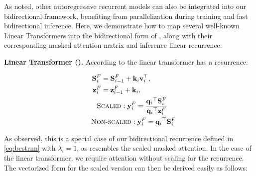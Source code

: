 As noted, other autoregressive recurrent models can also be integrated into our bidirectional framework, benefiting from parallelization during training and fast bidirectional inference. Here, we demonstrate how to map several well-known Linear Transformers into the bidirectional form of \lion, along with their corresponding masked attention matrix and inference linear recurrence.

\textbf{Linear Transformer (\textbf{\lionlit}).} According to \cite{trans_rnn} the linear transformer has a recurrence:

\begin{align}
{\mathbf{S}_i^F} &=   {\mathbf{S}_{i-1}^F} + \mathbf{k}_i \mathbf{v}_i^{\top}, \\
     {\mathbf{z}_i^F} & =   {\mathbf{z}_{i-1}^F} + {\mathbf{k}_i}, \\
    \hspace{4mm} \textsc{S}&\textsc{caled}:  {\mathbf{y}_i^F}= \frac{{{\mathbf{q}_i}}^{\top}  {\mathbf{S}_i^F}}{{{\mathbf{q}_i}}^{\top}  {\mathbf{z}_i^F}} \\
    \hspace{4mm} \textsc{No}&\textsc{n-scaled}:  {\mathbf{y}_i^F}= {{{\mathbf{q}_i}}^{\top}  {\mathbf{S}_i^F}}
\end{align}

As observed, this is a special case of our bidirectional recurrence defined in \eqref{eq:bestrnn} with \(\lambda_i = 1\), as \textbf{\lion} resembles the scaled masked attention. In the case of the linear transformer, we require attention without scaling for the recurrence. The vectorized form for the scaled version can then be derived easily as follows:

